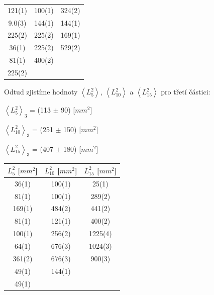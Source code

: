 \documentclass[a4paper,11pt]{article}
\begin{document}
\begin{minipage}{0.5\textwidth}
\begin{tabular}{|c|c|c|}
            121(1) & 100(1) & 324(2) \\
            9.0(3) & 144(1) & 144(1) \\
            225(2) & 225(2) & 169(1) \\
            36(1) & 225(2) & 529(2) \\
            81(1) & 400(2) &  \\
            225(2) &  &  \\
            \hline
            \end{tabular}
            \captionsetup{justification=centering, font=footnotesize}
        \vspace{15pt}
        \raggedright
        Odtud zjistíme hodnoty $\left\langle L_{5}^2\right\rangle$, $\left\langle L_{10}^2\right\rangle$ a $\left\langle L_{15}^2\right\rangle$ pro třetí částici: 
        \begin{center}
            $\left\langle L_{5}^2\right\rangle_3$ = (113 $\pm$ 90) [$mm^2$]
            \vspace{5pt}
            \par $\left\langle L_{10}^2\right\rangle_3$ = (251 $\pm$ 150) [$mm^2$]
            \vspace{5pt}
            \par $\left\langle L_{15}^2\right\rangle_3$ = (407 $\pm$ 180) [$mm^2$]
        \end{center}
        \vspace{15pt}
        \centering
        \begin{tabular}{|c|c|c|}
            \hline
            $L_5^2$ [$mm^2$] & $L_{10}^2$ [$mm^2$] & $L_{15}^2$ [$mm^2$] \\
            \hline
            36(1) & 100(1) & 25(1) \\
            81(1) & 100(1) & 289(2) \\
            169(1) & 484(2) & 441(2) \\
            81(1) & 121(1) & 400(2) \\
            100(1) & 256(2) & 1225(4) \\
            64(1) & 676(3) & 1024(3) \\
            361(2) & 676(3) & 900(3) \\
            49(1) & 144(1) &  \\
            49(1) &  &  \\
            \hline
            \end{tabular}
            \captionsetup{justification=centering, font=footnotesize}
    \end{minipage}
\end{document}
